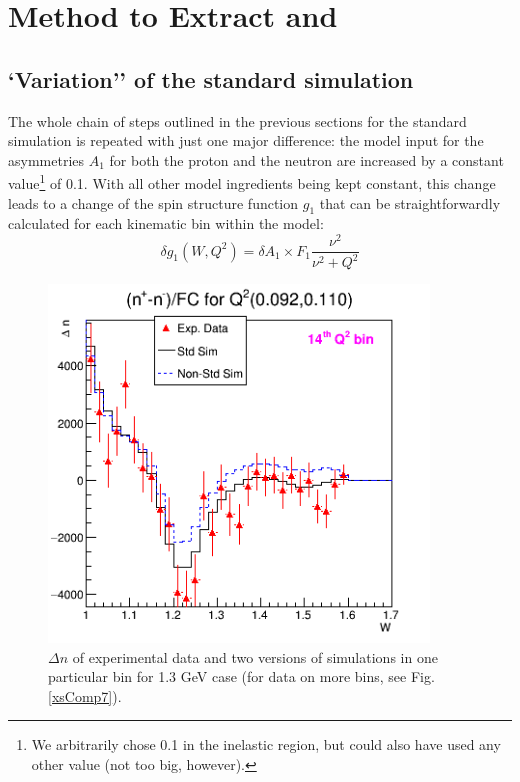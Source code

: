 \hspace{0.5cm}


\section{Method to Extract \gones and \afone}  %
\label{extraction}
%
\subsection{`Variation'' of the standard simulation}
\label{vari}


The whole chain of steps outlined in the previous sections for the standard simulation is repeated with just one major difference: the model input for the asymmetries $A_1$ for both the proton and the neutron are increased by a constant value\footnote{We arbitrarily chose 0.1 in the inelastic region, but could also have used any other value (not too big, however).} of 0.1. With all other model ingredients being kept constant, this change leads to a change of the spin structure function $g_1$ that can be straightforwardly calculated for each kinematic bin within the model:
\begin{equation}
\delta g_1(W,Q^2) = \delta A_1 \times F_1 \frac{\nu^2}{\nu^2 + Q^2}
\end{equation}

\begin{figure}[h] 
\centering
  \leavevmode \includegraphics[width=0.9\textwidth]{figuresEG4/FigAnal/xsDiff_StdD79_nStdD80C71S181Eb7FewBins70WbinsZmd.png} 
  \caption[$\Delta n$ in one \qsqs bin (1.3 GeV)]{$\Delta n$ of experimental data and two versions of simulations in one particular \qsqs bin for 1.3 GeV case (for data on more \qsqs bins, see Fig. \ref{xsComp7}).}
  \label{xs1q7}  
\end{figure}




